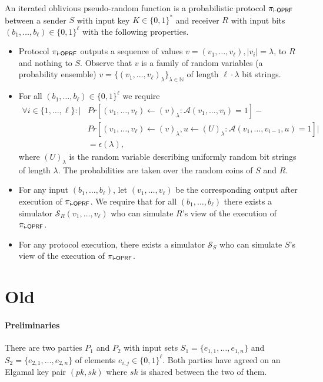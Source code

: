 \documentclass{article}
\newcommand{\dash}[0]{{\text -}}
\newcommand{\A}[0]{{\mathcal{A}}}
\newcommand{\ioprf}[0]{\mathsf{i}\dash\mathsf{OPRF}}
\newcommand{\proto}[0]{{\pi_{\ioprf}}}
\newcommand{\myS}[0]{{\mathcal{S}}}
\newcommand{\N}[0]{{\mathbb{N}}}
\begin{document}
An iterated oblivious pseudo-random function is a probabilistic protocol
$\proto$ between a sender $S$ with input key $K\in\{0,1\}^*$ and receiver $R$
with input bits $(b_1,\ldots,b_\ell)\in\{0,1\}^{\ell}$ with the following properties.

\begin{itemize}
\item Protocol $\proto$ outputs a sequence of values
  $v=(v_1,\ldots,v_\ell),|v_i|=\lambda$, to $R$ and nothing to $S$.
  Observe that $v$ is a family of random variables (a probability
  ensemble) $v=\{(v_1,\ldots,v_\ell)_{\lambda}\}_{\lambda\in\N}$ of length
  $\ell\cdot\lambda$ bit strings.
  
\item 
For all $(b_1,\ldots,b_\ell)\in\{0,1\}^\ell$ we require
\begin{align*}\forall{}i\in\{1,\ldots,\ell\}:|&Pr[(v_1,\ldots,v_\ell)\leftarrow{}(v)_\lambda:\A(v_1,\ldots,v_i)=1]-\\&Pr[(v_1,\ldots,v_\ell)\leftarrow{}(v)_\lambda,u\leftarrow{}(U)_\lambda:\A(v_1,\ldots,v_{i-1},u)=1]|\\&=\epsilon(\lambda),
  \end{align*}
  where $(U)_\lambda$ is the random variable describing uniformly random
  bit strings of length $\lambda$. The probabilities are taken over
  the random coins of $S$ and $R$.

\item For any input $(b_1,\ldots,b_\ell)$, let
  $(v_1,\ldots,v_\ell)$ be the corresponding output after execution of
  $\proto$. We require that for all $(b_1,\ldots,b_\ell)$ there exists
  a simulator $\myS_R(v_1,\ldots,v_\ell)$ who can simulate $R$'s view
  of the execution of $\proto$.

\item For any protocol execution, there exists a simulator $\myS_S$ who
  can simulate $S$'s view of the execution of $\proto$.
  
\end{itemize}

\section{Old}
\paragraph{Preliminaries} There are two parties $P_1$ and $P_2$ with
input sets $S_1=\{e_{1,1},\ldots,e_{1,n}\}$ and
$S_2=\{e_{2,1},\ldots,e_{2,n}\}$ of elements
$e_{i,j}\in\{0,1\}^\ell$. Both parties have agreed on an Elgamal key
pair $(pk,sk)$ where $sk$ is shared between the two of them.
\end{document}
